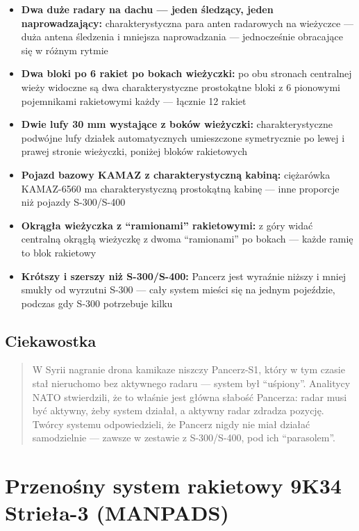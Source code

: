 \documentclass[12pt,openany,oneside]{book}
\providecommand{\tightlist}{%
  \setlength{\itemsep}{0pt}\setlength{\parskip}{0pt}}
\begin{document}
\begin{itemize}
\tightlist
\item
  \textbf{Dwa duże radary na dachu --- jeden śledzący, jeden
  naprowadzający:} charakterystyczna para anten radarowych na wieżyczce
  --- duża antena śledzenia i mniejsza naprowadzania --- jednocześnie
  obracające się w różnym rytmie
\item
  \textbf{Dwa bloki po 6 rakiet po bokach wieżyczki:} po obu stronach
  centralnej wieży widoczne są dwa charakterystyczne prostokątne bloki z
  6 pionowymi pojemnikami rakietowymi każdy --- łącznie 12 rakiet
\item
  \textbf{Dwie lufy 30 mm wystające z boków wieżyczki:}
  charakterystyczne podwójne lufy działek automatycznych umieszczone
  symetrycznie po lewej i prawej stronie wieżyczki, poniżej bloków
  rakietowych
\item
  \textbf{Pojazd bazowy KAMAZ z charakterystyczną kabiną:} ciężarówka
  KAMAZ-6560 ma charakterystyczną prostokątną kabinę --- inne proporcje
  niż pojazdy S-300/S-400
\item
  \textbf{Okrągła wieżyczka z ``ramionami'' rakietowymi:} z góry widać
  centralną okrągłą wieżyczkę z dwoma ``ramionami'' po bokach --- każde
  ramię to blok rakietowy
\item
  \textbf{Krótszy i szerszy niż S-300/S-400:} Pancerz jest wyraźnie
  niższy i mniej smukły od wyrzutni S-300 --- cały system mieści się na
  jednym pojeździe, podczas gdy S-300 potrzebuje kilku
\end{itemize}

\section{Ciekawostka}\label{ciekawostka-30}

\begin{quote}
W Syrii nagranie drona kamikaze niszczy Pancerz-S1, który w tym czasie
stał nieruchomo bez aktywnego radaru --- system był ``uśpiony''.
Analitycy NATO stwierdzili, że to właśnie jest główna słabość Pancerza:
radar musi być aktywny, żeby system działał, a aktywny radar zdradza
pozycję. Twórcy systemu odpowiedzieli, że Pancerz nigdy nie miał działać
samodzielnie --- zawsze w zestawie z S-300/S-400, pod ich ``parasolem''.
\end{quote}

\chapter{Przenośny system rakietowy 9K34 Strieła-3
(MANPADS)}\label{przenoux15bny-system-rakietowy-9k34-strieux142a-3-manpads}
\end{document}
